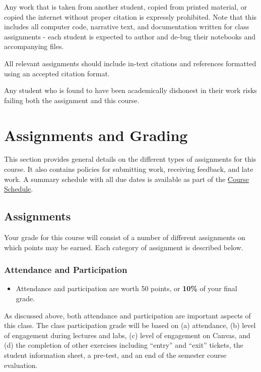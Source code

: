\documentclass[
]{book}
\newenvironment{rmdblock}[1]
  {\begin{shaded*}
  \begin{itemize}
  \renewcommand{\labelitemi}{
    \raisebox{-.7\height}[0pt][0pt]{
      {\setkeys{Gin}{width=3em,keepaspectratio}\texttt{[image: images/\#1]}}
    }
  }
  \item
  }
  {
  \end{itemize}
  \end{shaded*}
  }
\newenvironment{rmdtip}
  {\begin{rmdblock}{tip}}
  {\end{rmdblock}}
\begin{document}
Any work that is taken from another student, copied from printed material, or copied the internet without proper citation is expressly prohibited. Note that this includes all computer code, narrative text, and documentation written for class assignments - each student is expected to author and de-bug their notebooks and accompanying files.

All relevant assignments should include in-text citations and references formatted using an accepted citation format.

Any student who is found to have been academically dishonest in their work risks failing both the assignment and this course.

\hypertarget{assignments-and-grading}{%
\chapter{Assignments and Grading}\label{assignments-and-grading}}

This section provides general details on the different types of assignments for this course. It also contains policies for submitting work, receiving feedback, and late work. A summary schedule with all due dates is available as part of the \href{course-schedule.html}{Course Schedule}.

\hypertarget{assignments}{%
\section{Assignments}\label{assignments}}

Your grade for this course will consist of a number of different assignments on which points may be earned. Each category of assignment is described below.

\hypertarget{attendance-and-participation-1}{%
\subsection{Attendance and Participation}\label{attendance-and-participation-1}}

\begin{rmdtip}
Attendance and participation are worth 50 points, or \textbf{10\%} of
your final grade.
\end{rmdtip}

As discussed above, both attendance and participation are important aspects of this class. The class participation grade will be based on (a) attendance, (b) level of engagement during lectures and labs, (c) level of engagement on Canvas, and (d) the completion of other exercises including ``entry'' and ``exit'' tickets, the student information sheet, a pre-test, and an end of the semester course evaluation.
\end{document}

